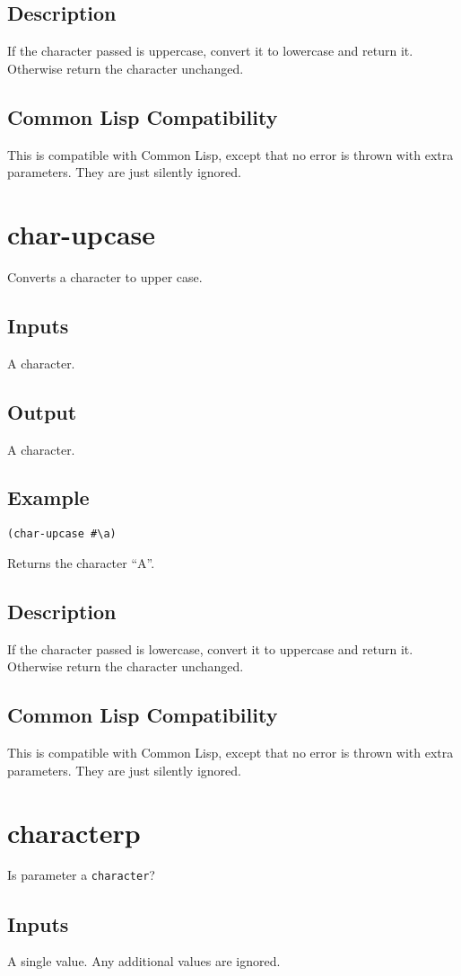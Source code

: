 \documentclass[10pt, openany]{book}
\newcommand{\datatype}[1]{\texttt{#1}}
\newcommand{\cl}{Common Lisp}
\begin{document}
\subsection{Description}
If the character passed is uppercase, convert it to lowercase and return it.  Otherwise return the character unchanged.
\subsection{Common Lisp Compatibility}
This is compatible with \cl, except that no error is thrown with extra parameters.  They are just silently ignored.

\section{char-upcase}
Converts a character to upper case.
\subsection{Inputs}
A character.
\subsection{Output}
A character.
\subsection{Example}
\begin{lstlisting}
(char-upcase #\a)
\end{lstlisting}
Returns the character ``A''.
\subsection{Description}
If the character passed is lowercase, convert it to uppercase and return it.  Otherwise return the character unchanged.
\subsection{Common Lisp Compatibility}
This is compatible with \cl, except that no error is thrown with extra parameters.  They are just silently ignored.

\section{characterp}
Is parameter a \datatype{character}?
\subsection{Inputs}
A single value.  Any additional values are ignored.
\end{document}
